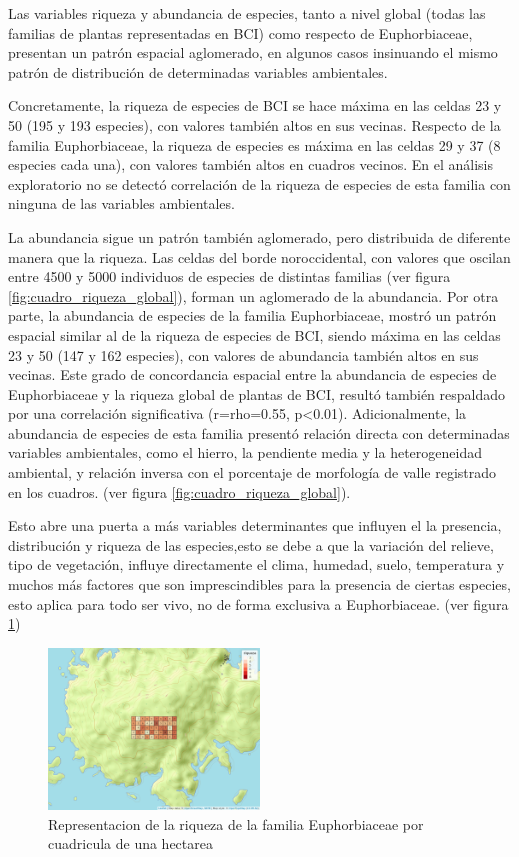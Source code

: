\documentclass[11pt,]{article}
\begin{document}
Las variables riqueza y abundancia de especies, tanto a nivel global
(todas las familias de plantas representadas en BCI) como respecto de
Euphorbiaceae, presentan un patrón espacial aglomerado, en algunos casos
insinuando el mismo patrón de distribución de determinadas variables
ambientales.

Concretamente, la riqueza de especies de BCI se hace máxima en las
celdas 23 y 50 (195 y 193 especies), con valores también altos en sus
vecinas. Respecto de la familia Euphorbiaceae, la riqueza de especies es
máxima en las celdas 29 y 37 (8 especies cada una), con valores también
altos en cuadros vecinos. En el análisis exploratorio no se detectó
correlación de la riqueza de especies de esta familia con ninguna de las
variables ambientales.

La abundancia sigue un patrón también aglomerado, pero distribuida de
diferente manera que la riqueza. Las celdas del borde noroccidental, con
valores que oscilan entre 4500 y 5000 individuos de especies de
distintas familias (ver figura \ref{fig:cuadro_riqueza_global}), forman
un aglomerado de la abundancia. Por otra parte, la abundancia de
especies de la familia Euphorbiaceae, mostró un patrón espacial similar
al de la riqueza de especies de BCI, siendo máxima en las celdas 23 y 50
(147 y 162 especies), con valores de abundancia también altos en sus
vecinas. Este grado de concordancia espacial entre la abundancia de
especies de Euphorbiaceae y la riqueza global de plantas de BCI, resultó
también respaldado por una correlación significativa (r=rho=0.55,
p\textless{}0.01). Adicionalmente, la abundancia de especies de esta
familia presentó relación directa con determinadas variables
ambientales, como el hierro, la pendiente media y la heterogeneidad
ambiental, y relación inversa con el porcentaje de morfología de valle
registrado en los cuadros. (ver figura \ref{fig:cuadro_riqueza_global}).

Esto abre una puerta a más variables determinantes que influyen el la
presencia, distribución y riqueza de las especies,esto se debe a que la
variación del relieve, tipo de vegetación, influye directamente el
clima, humedad, suelo, temperatura y muchos más factores que son
imprescindibles para la presencia de ciertas especies, esto aplica para
todo ser vivo, no de forma exclusiva a Euphorbiaceae. (ver figura
\ref{fig:cuadro_de_riqueza_familia})

\begin{figure}
\centering
\includegraphics[width=0.50000\textwidth]{mapa_cuadros_riq_mi_familia.png}
\caption{\label{fig:cuadro_de_riqueza_familia}Representacion de la
riqueza de la familia Euphorbiaceae por cuadricula de una hectarea}
\end{figure}
\end{document}
